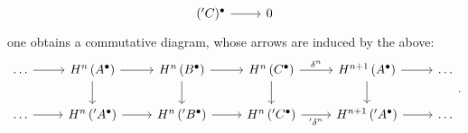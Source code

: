 \documentclass[../Main]{subfiles}
\begin{document}
\begin{lem}
\begin{equation}
\begin{tikzcd}
		('C)^\bullet \arrow[r, "", rightarrow] &
		0
	\end{tikzcd}
	\end{equation} 
	one obtains a commutative diagram, whose arrows are induced by the above:
	\begin{equation*}
	\begin{tikzcd}
		\ldots \arrow[r, "", rightarrow] &
		H^{n} \left( A^\bullet \right)\arrow[r, "", rightarrow] \arrow[d, "", rightarrow] &
		H^{n} \left( B^\bullet \right) \arrow[r, "", rightarrow] \arrow[d, "", rightarrow] &
		H^{n} \left( C^\bullet \right) \arrow[r, "\delta^n", rightarrow] \arrow[d, "", rightarrow] &
		H^{n+1} \left( A^\bullet \right) \arrow[d, "", rightarrow] 
		\arrow[r, "", rightarrow] &
		\ldots \\
		\ldots \arrow[r, "", rightarrow] &
		H^{n} \left( 'A^\bullet \right)\arrow[r, "", rightarrow] &
		H^{n} \left( 'B^\bullet \right) \arrow[r, "", rightarrow] &
		H^{n} \left( 'C^\bullet \right) \arrow[r, "'\delta^n"', rightarrow] &
		H^{n+1} \left( 'A^\bullet \right) \arrow[r, "", rightarrow] &
		\ldots
	\end{tikzcd}
	.\end{equation*} 
\end{lem} 
\end{document}
